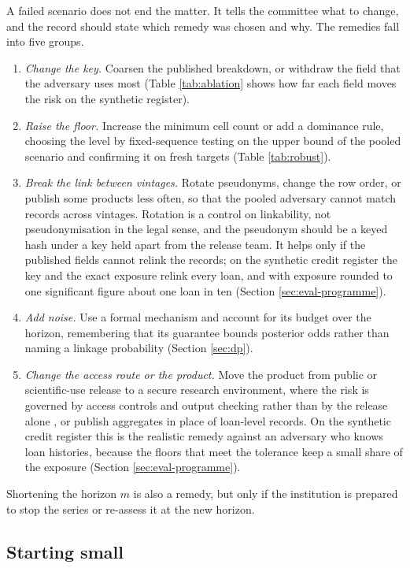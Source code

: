 A failed scenario does not end the matter. It tells the committee what to change,
and the record should state which remedy was chosen and why. The remedies fall
into five groups.
\begin{enumerate}
\item \emph{Change the key.} Coarsen the published breakdown, or withdraw the
field that the adversary uses most (Table \ref{tab:ablation} shows how far each
field moves the risk on the synthetic register).
\item \emph{Raise the floor.} Increase the minimum cell count or add a dominance
rule, choosing the level by fixed-sequence testing on the upper bound of the
pooled scenario and confirming it on fresh targets (Table \ref{tab:robust}).
\item \emph{Break the link between vintages.} Rotate pseudonyms, change the row order,
or publish some products less often, so that the pooled adversary cannot match
records across vintages. Rotation is a control on linkability, not
pseudonymisation in the legal sense, and the pseudonym should be a keyed hash
under a key held apart from the release team. It helps only if the published
fields cannot relink the records; on the synthetic credit register the key and
the exact exposure relink every loan, and with exposure rounded to one
significant figure about one loan in ten (Section \ref{sec:eval-programme}).
\item \emph{Add noise.} Use a formal mechanism and account for its budget over the
horizon, remembering that its guarantee bounds posterior odds rather than naming a
linkage probability (Section \ref{sec:dp}).
\item \emph{Change the access route or the product.} Move the product from public
or scientific-use release to a secure research environment, where the risk is
governed by access controls and output checking rather than by the release alone
\citep{desai2016}, or publish aggregates in place of loan-level records. On the
synthetic credit register this is the realistic remedy against an adversary who
knows loan histories, because the floors that meet the tolerance keep a small
share of the exposure (Section \ref{sec:eval-programme}).
\end{enumerate}
Shortening the horizon $m$ is also a remedy, but only if the institution is prepared
to stop the series or re-assess it at the new horizon.

\subsection{Starting small}\label{sec:apply-pilot}

